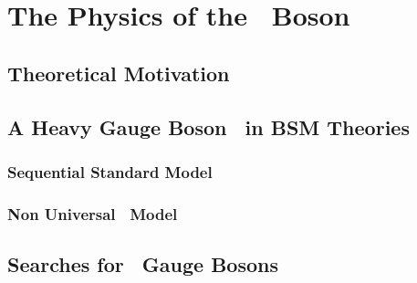 \chapter[The Physics Of The \Zprime~Boson]{The Physics of the \Zprime~Boson}
\label{chap:Zp}

\section{Theoretical Motivation}
\label{sec:Motivation}

\section{A Heavy Gauge Boson \Zprime~in BSM Theories}
\label{sec:Models}

\subsection{Sequential Standard Model}
\label{subsec:SSM}

\subsection{Non Universal \Zprime~Model}
\label{subsec:Models}

\section{Searches for \Zprime~Gauge Bosons}
\label{sec:Models}


